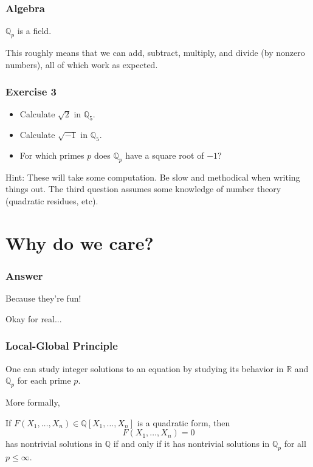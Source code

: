 \documentclass[10pt]{beamer}
\begin{document}
\begin{frame}
    \frametitle{Algebra}

    \begin{center}
        \huge \(\mathbb{Q}_p\) is a field.        
    \end{center}

    \normalsize This roughly means that we can add, subtract, multiply, and divide (by nonzero numbers), all of which work as expected.

\end{frame}

\begin{frame}
    \frametitle{Exercise 3}

    \begin{itemize}
        \item Calculate \(\sqrt{2}\) in \(\mathbb{Q}_5\).
        \item Calculate \(\sqrt{-1}\) in \(\mathbb{Q}_5\).
        \item For which primes \(p\) does \(\mathbb{Q}_p\) have a square root of \(-1\)?
    \end{itemize}

    Hint: These will take some computation.
    Be slow and methodical when writing things out.
    The third question assumes some knowledge of number theory (quadratic residues, etc).

\end{frame}

\section{Why do we care?}

\begin{frame}
    \frametitle{Answer}

    \Huge Because they're fun!
    
    \normalsize Okay for real...

\end{frame}

\begin{frame}
    \frametitle{Local-Global Principle}

    One can study integer solutions to an equation by studying its behavior in \(\mathbb{R}\) and \(\mathbb{Q}_p\) for each prime \(p\).

    More formally, 

    \begin{theorem}
        If \(F(X_1,\ldots,X_n)\in\mathbb{Q}[X_1,\ldots,X_n]\) is a quadratic form, then 
        \[F(X_1,\ldots,X_n)=0\]
        has nontrivial solutions in \(\mathbb{Q}\) if and only if it has nontrivial solutions in \(\mathbb{Q}_p\) for all \(p\leq\infty\).
    \end{theorem}

\end{frame}
\end{document}
